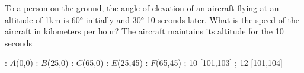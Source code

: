 
%
%
%
%
% 
% 

\question[3] To a person on the ground, the angle of elevation of an aircraft flying at an altitude of 1km 
is $\ang{60}$ initially and $\ang{30}$ 10 seconds later. What is the speed of the
aircraft in kilometers per hour? The aircraft maintains its altitude for the 10 seconds


\ifprintanswers
  \begin{marginfigure}
      : $A$(0,0)
      : $B$(25,0)
      : $C$(65,0)
      : $E$(25,45)
      : $F$(65,45)
    \figdrawbegin{}
      \figdrawline [100,101,102,104,103,100]
      \figdrawline [100,103]
      \figdrawline [100,104]
      \figdrawline [103,101]
       ; 10 [101,103] 
       ; 12 [101,104] 
    \figdrawend
    \centerline{\box\figBoxA}
  \end{marginfigure}
\fi 

